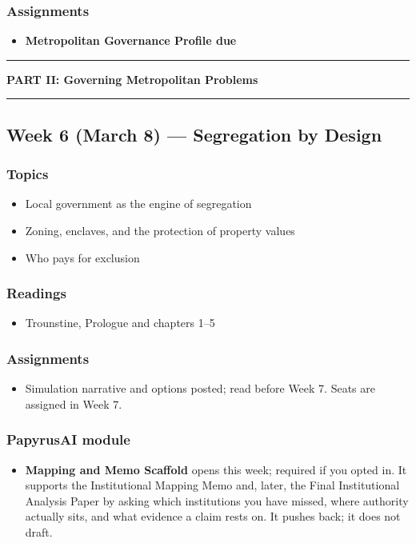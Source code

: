 \documentclass[12pt]{article}
\begin{document}
    \subsubsection*{Assignments}
        \begin{itemize}
            \item \textbf{Metropolitan Governance Profile due}
        \end{itemize}

\bigskip
\noindent\rule{\textwidth}{0.6pt}
\begin{center}\textbf{PART II: Governing Metropolitan Problems}\end{center}
\noindent\rule{\textwidth}{0.6pt}

\subsection*{Week 6 (March 8) --- Segregation by Design}
    \subsubsection*{Topics}
        \begin{itemize}
            \item Local government as the engine of segregation
            \item Zoning, enclaves, and the protection of property values
            \item Who pays for exclusion
        \end{itemize}
    \subsubsection*{Readings}
        \begin{itemize}
            \item Trounstine, Prologue and chapters 1--5
        \end{itemize}
    \subsubsection*{Assignments}
        \begin{itemize}
            \item Simulation narrative and options posted; read before Week 7. Seats are assigned in Week 7.
        \end{itemize}
    \subsubsection*{PapyrusAI module}
        \begin{itemize}
            \item \textbf{Mapping and Memo Scaffold} opens this week; required if you opted in. It supports the Institutional Mapping Memo and, later, the Final Institutional Analysis Paper by asking which institutions you have missed, where authority actually sits, and what evidence a claim rests on. It pushes back; it does not draft.
        \end{itemize}
\end{document}
